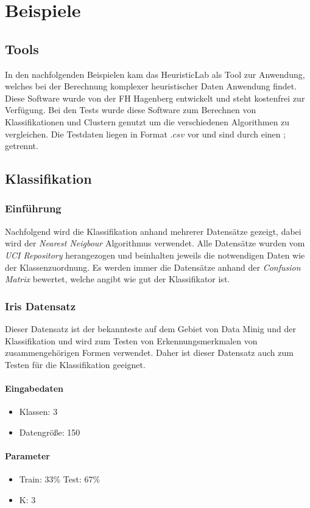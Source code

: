 \chapter{Beispiele}
\section{Tools}
In den nachfolgenden Beispielen kam das HeuristicLab als Tool zur Anwendung,
welches bei der Berechnung komplexer heuristischer Daten Anwendung findet.
Diese Software wurde von der FH Hagenberg entwickelt und steht kostenfrei zur Verfügung. Bei den Tests wurde diese Software zum Berechnen von Klassifikationen und Clustern genutzt um die verschiedenen Algorithmen zu vergleichen. Die Testdaten liegen in Format \(.csv\) vor und sind durch einen \(;\) getrennt.
\section{Klassifikation}
\subsection{Einführung}
Nachfolgend wird die Klassifikation anhand mehrerer Datensätze gezeigt, dabei wird der \textit{Nearest Neigbour} Algorithmus verwendet. Alle Datensätze wurden vom \textit{UCI Repository} herangezogen und beinhalten jeweils die notwendigen Daten wie der Klassenzuordnung. Es werden immer die Datensätze anhand der \textit{Confusion Matrix} bewertet, welche angibt wie gut der Klassifikator ist. \cite{uci}
\subsection{Iris Datensatz}
Dieser Datensatz ist der bekannteste auf dem Gebiet von Data Minig und der Klassifikation und wird zum Testen von Erkennungsmerkmalen von zusammengehörigen Formen verwendet. Daher ist dieser Datensatz auch zum Testen für die Klassifikation geeignet. \cite{uci}
\subsubsection{Eingabedaten}
\begin{itemize}
	\item Klassen: 3
	\item Datengröße: 150
\end{itemize}
\subsubsection{Parameter}
\begin{itemize}
	\item Train: 33\% Test: 67\%
	\item K: 3 
\end{itemize}
